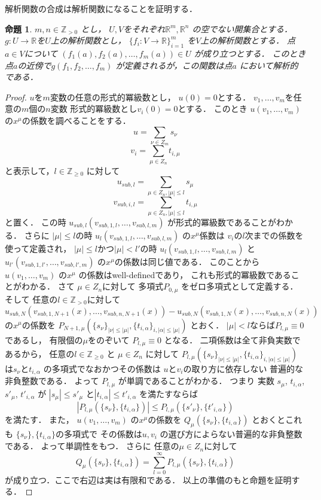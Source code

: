 \documentclass[leqno, a4paper, 12pt]{jsarticle}
\newtheorem{prop}[thm]{命題}
\newcommand{\zz}{\mathbb{Z}}
\newcommand{\rr}{\mathbb{R}}
\begin{document}
解析関数の合成は解析関数になることを証明する．
\begin{prop}
$m, n\in \zz_{>0}$
とし，
$U, V$をそれぞれ$\rr^m, \rr^n$
の空でない開集合とする．
$g: U\to \rr$を$U$上の解析関数とし，
$\{f_i: V\to \rr\}_{i=1}^m$
を$V$上の解析関数とする．
点$a\in V$について
$(f_1(a), f_2(a), \dots, f_m(a))\in U$
が成り立つとする．
このとき
点$a$の近傍で$g(f_1, f_2, \dots, f_m)$
が定義されるが，この関数は点$a$
において解析的である．
\end{prop}
\begin{proof}
$u$を$m$変数の任意の形式的冪級数とし，
$u(0)=0$とする．
$v_1, \dots, v_m$を任意の$m$個の$n$変数
形式的冪級数とし$v_i(0)=0$とする．
このとき
$u(v_1, \dots, v_m)$
の$x^{\mu}$の係数を調べることをする．
\[
u=\sum_{\nu\in Z_m}s_{\nu}
\]
\[
v_i=\sum_{\mu\in Z_n}t_{i, \mu}
\]
と表示して，$l\in \zz_{\ge 0}$
に対して
\[
u_{sub, l}=\sum_{\mu\in Z_n, |\mu|\le l}s_{\mu}
\]
\[
v_{sub, i, l}=\sum_{\mu\in Z_n, |\mu|\le l}t_{i, \mu}
\]
と置く．
この時
$u_{sub, l}(v_{sub, 1, l}, \dots, v_{sub, l, m})$
が形式的冪級数であることがわかる．
さらに
$|\mu|\le l$の時
$u_{l}(v_{sub, 1, l}, \dots, v_{sub, l, m})$
の$x^{\mu}$係数は
$v_i$の$l$次までの係数を使って定義され，
$|\mu|\le l$かつ$|\mu|<l'$の時
$u_{l}(v_{sub, 1, l}, \dots, v_{sub, l, m})$
と
$u_{l'}(v_{sub, 1, l'}, \dots, v_{sub, l', m})$
の$x^{\mu}$の係数は同じ値である．
このことから
$u(v_1, \dots, v_m)$
の$x^{\mu}$
の係数はwell-definedであり，
これも形式的冪級数であることがわかる．
さて
$\mu\in Z_n$に対して
多項式$P_{0, \mu}$
をゼロ多項式として定義する．
そして
任意の$l\in \zz_{> 0}$に対して
\[
u_{sub, N}(v_{sub, 1, N+1}(x), \dots, v_{sub, n, N+1}(x))-
u_{sub, N}(v_{sub, 1, N}(x), \dots, v_{sub, n, N}(x))
\]
の$x^{\mu}$の係数を
$P_{N+1, \mu}(\{s_{\nu}\}_{|\nu|\le |\mu|}, \{t_{i, \alpha}\}_{i, |\alpha|\le |\mu|})$
とおく．
$|\mu|<l$ならば$P_{l, \mu}\equiv0$であるし，
有限個の$\mu$をのぞいて
$P_{l, \mu}\equiv 0$
となる．
二項係数は全て非負実数であるから，
任意の$l\in \zz_{\ge 0}$
と
$\mu\in Z_n$
に対して
$P_{l, \mu}(\{s_{\nu}\}_{|\nu|\le |\mu|}, \{t_{i, \alpha}\}_{i, |\alpha|\le |\mu|})$
は$s_{\nu}$と$t_{i, \alpha}$
の多項式でなおかつその係数は
$u$と$v_i$の取り方に依存しない
普遍的な非負整数である．
よって
$P_{l, \mu}$
が単調であることがわかる．
つまり
実数
$s_{\mu}$, $t_{i, \alpha}$, $s'_{\mu}$, $t'_{i, \alpha}$
が
$|s_{\mu}|\le s'_{\mu}$
と$|t_{i, \alpha}|\le t'_{i, \alpha}$
を満たすならば
\[
|P_{l, \mu}(\{s_{\nu}\}, \{t_{i, \alpha}\})|
\le 
P_{l, \mu}(\{s'_{\nu}\}, \{t'_{i, \alpha}\})
\]
を満たす．
また，
$u(v_1, \dots, v_m)$
の$x^{\mu}$の係数を
$Q_{\mu}(\{s_{\nu}\}, \{t_{i, \alpha}\})$
とおくとこれも
$\{s_{\nu}\}, \{t_{i, \alpha}\}$の多項式で
その係数は$u, v_i$
の選び方によらない普遍的な非負整数である．
よって単調性をもつ．
さらに
任意の$\mu\in Z_n$に対して
\[
Q_{\mu}(\{s_{\nu}\}, \{t_{i, \alpha}\})
=\sum_{l=0}^{\infty}P_{l, \mu}(\{s_{\nu}\}, \{t_{i, \alpha}\})
\]
が成り立つ．ここで右辺は実は有限和である．
以上の準備のもと命題を証明する．


\end{proof}
\end{document}

